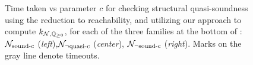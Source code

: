 \begin{figure}
    \centering

    \caption{Time taken vs parameter $c$ for checking structural quasi-soundness using the reduction to reachability, and utilizing our approach to compute $k_{\mathcal{N},\mathbb{Q}_{\ge 0}}$, for each of the three families at the bottom of : $\mathcal{N}_{\text{sound-}c}$ (\emph{left}),$\mathcal{N}_{\neg \text{quasi-}c}$ (\emph{center}), $\mathcal{N}_{\neg \text{sound-}c}$ (\emph{right}).
        Marks on the gray line denote timeouts.}\label{fig:synth-struct-results}
\end{figure}
